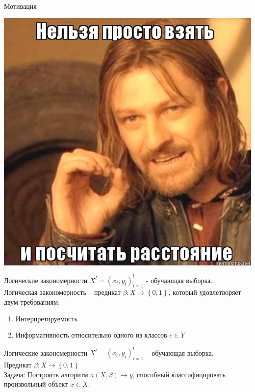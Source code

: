 \documentclass[10pt]{beamer}
\begin{document}
\begin{frame}{Мотивация}
  \begin{center}
	  \includegraphics[width=\textwidth, height=0.8 \textheight, keepaspectratio]{images/distance}
	  \end{center}
\end{frame}

\begin{frame}{Логические закономерности}
	${X^l = \left( x_i, y_i \right)_{i=1}^l}$ - обучающая выборка.\\
	\bigbreak
	\alert{Логическая закономерность} -- предикат ${\beta: X \rightarrow \left\{ 0, 1 \right\} }$, который удовлетворяет двум требованиям:\\
	\pause
	\begin{enumerate} 
		\item Интерпретируемость
		\pause
		\item Информативность относительно одного из классов ${c \in Y}$
	\end{enumerate}
\end{frame}

\begin{frame}{Логические закономерности}
	${X^l = \left( x_i, y_i \right)_{i=1}^l}$ -- обучающая выборка.\\
	\bigbreak
  Предикат ${\beta: X \rightarrow \left\{ 0, 1 \right\} }$\\
	\bigbreak
	\alert{Задача}: Построить алгоритм $a(X, \beta) \rightarrow y$, способный классифицировать произвольный объект ${x \in X}$.
\end{frame}
\end{document}
